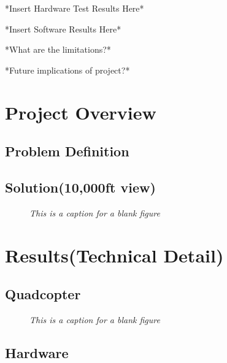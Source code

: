 \documentclass[11pt]{article}
\begin{document}
*Insert Hardware Test Results Here*

*Insert Software Results Here*

*What are the limitations?*

*Future implications of project?*

\pagebreak

\tableofcontents

\pagebreak

\listoffigures

\pagebreak

\section{Project Overview}
\blindtext
\subsection{Problem Definition}
\blindtext
\subsection{Solution(10,000ft view)}
\blindtext

    \begin{figure}[H]
	\centering	
	\caption{\textit{This is a caption for a blank figure}}	
	\end{figure}


\section{Results(Technical Detail)}
\subsection{Quadcopter}

\blindtext

    \begin{figure}[H]
	\centering	
	\caption{\textit{This is a caption for a blank figure}}	
	\end{figure}

\subsection{Hardware}
\end{document}
